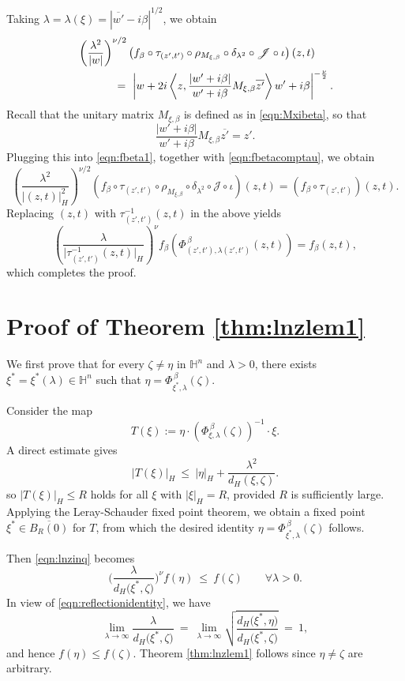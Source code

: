 \documentclass[reqno]{amsart}
\theoremstyle{definition}
\theoremstyle{remark}
\numberwithin{equation}{section}
\begin{document}
Taking $\lambda=\lambda\left(\xi\right)=\left|\overline{w'}-i\beta\right|^{1/2}$, we obtain
\begin{align}\label{eqn:fbeta1}
& \left(\frac{\lambda^{2}}{|w|}\right)^{\nu/2} 
\left(f_\beta \circ \tau_{(z',t')} \circ \rho_{M_{\xi,\beta}} \circ \delta_{\lambda^{2}}
\circ \mathscr{J} \circ \iota \right) (z,t) \notag\\
& \qquad \quad ~=~\left| w + 2i \left\langle z, \frac{\left|w'+i\beta\right|}{w'+i\beta} 
M_{\xi,\beta} \overline{z'} \right\rangle w' + i\beta \right|^{-\frac{\nu}{2}}.
\end{align}
Recall that the unitary matrix $M_{\xi,\beta}$ is defined as in \eqref{eqn:Mxibeta}, so that
\[
\frac{\left|w'+i\beta\right|}{w'+i\beta} M_{\xi,\beta} \overline{z'} = z'.
\]
Plugging this into \eqref{eqn:fbeta1}, together with \eqref{eqn:fbetacomptau}, we obtain
\[
\left(\frac{\lambda^{2}}{|(z,t)|_{\! H}^2 }\right)^{\nu/2} 
\left(f_\beta \circ \tau_{(z',t')} \circ \rho_{M_{\xi,\beta}} \circ \delta_{\lambda^{2}}
\circ \mathscr{J} \circ \iota \right) (z,t) 
=\left( f_\beta \circ \tau_{(z',t')}\right)(z,t).
\]
Replacing $(z,t)$ with $\tau_{(z',t')}^{-1} (z,t)$ in the above yields
\[
\left(\frac{\lambda}{\big|\tau_{(z',t')}^{-1} (z,t) \big|_{\! H} }\right)^{\nu} 
f_\beta \left(\Phi_{(z',t'), \lambda(z',t')}^{\, \beta} (z,t)\right)
=f_\beta (z,t),
\]
which completes the proof.



\section{Proof of Theorem \ref{thm:lnzlem1}}
\label{sec:PfofLNZ1}

We first prove that for every $\zeta \neq \eta$ in $\mathbb{H}^{n}$ and $\lambda > 0$, there exists $\xi^{\ast} = \xi^{\ast}(\lambda) \in \mathbb{H}^n$ such that $\eta = \Phi_{\xi^{\ast},\lambda}^{\,\beta}(\zeta)$.

Consider the map
\[
T(\xi) := \eta \cdot \left( \Phi_{\xi,\lambda}^{\, \beta} (\zeta)\right)^{-1} \cdot \xi. 
\]
A direct estimate gives
\[
|T(\xi)|_{\! H} ~\leq~ |\eta|_{\! H} + \frac {\lambda^2}{d_{\! H}\! (\xi,\zeta)}.
\]
so $|T(\xi)|_{\! H} \leq R$ holds for all $\xi$ with $|\xi|_{\! H} = R$, provided $R$ is sufficiently large. Applying the Leray-Schauder fixed point theorem, we obtain a fixed point $\xi^{\ast} \in \overline{B_R(0)}$ for $T$, from which the desired identity $\eta = \Phi_{\xi^{\ast},\lambda}^{\,\beta}(\zeta)$ follows.

Then \eqref{eqn:lnzinq} becomes
\[
\bigg(\frac{\lambda}{d_{\! H}\big (\xi^{\ast},\zeta\big)}\bigg)^{\nu} f(\eta) ~\leq~ f(\zeta)
\qquad \forall \lambda>0.
\]
In view of \eqref{eqn:reflectionidentity}, we have
\[
\lim_{\lambda\to \infty} \frac{\lambda}{d_{\! H}\! \big(\xi^{\ast},\zeta\big)} ~=~
\lim_{\lambda\to \infty} \sqrt{\frac{d_{\! H}\! \big(\xi^{\ast},\eta\big)}
{d_{\! H}\! \big(\xi^{\ast},\zeta\big)}} ~=~ 1,
\]
and hence $f(\eta)\leq f(\zeta)$.
Theorem \ref{thm:lnzlem1} follows since $\eta \neq \zeta$ are arbitrary.
\end{document}
